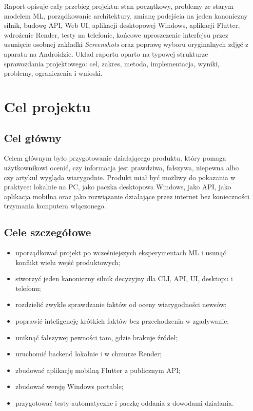 \documentclass[12pt,a4paper]{article}
\begin{document}
Raport opisuje cały przebieg projektu: stan początkowy, problemy ze starym modelem ML, porządkowanie architektury, zmianę podejścia na jeden kanoniczny silnik, budowę API, Web UI, aplikacji desktopowej Windows, aplikacji Flutter, wdrożenie Render, testy na telefonie, końcowe uproszczenie interfejsu przez usunięcie osobnej zakładki \textit{Screenshots} oraz poprawę wyboru oryginalnych zdjęć z aparatu na Androidzie.
Układ raportu oparto na typowej strukturze sprawozdania projektowego: cel, zakres, metoda, implementacja, wyniki, problemy, ograniczenia i wnioski.

\section{Cel projektu}
\subsection{Cel główny}
Celem głównym było przygotowanie działającego produktu, który pomaga użytkownikowi ocenić, czy informacja jest prawdziwa, fałszywa, niepewna albo czy artykuł wygląda wiarygodnie.
Produkt miał być możliwy do pokazania w praktyce: lokalnie na PC, jako paczka desktopowa Windows, jako API, jako aplikacja mobilna oraz jako rozwiązanie działające przez internet bez konieczności trzymania komputera włączonego.

\subsection{Cele szczegółowe}
\begin{itemize}
  \item uporządkować projekt po wcześniejszych eksperymentach ML i usunąć konflikt wielu wejść produktowych;
  \item stworzyć jeden kanoniczny silnik decyzyjny dla CLI, API, UI, desktopu i telefonu;
  \item rozdzielić zwykłe sprawdzanie faktów od oceny wiarygodności newsów;
  \item poprawić inteligencję krótkich faktów bez przechodzenia w zgadywanie;
  \item uniknąć fałszywej pewności tam, gdzie brakuje źródeł;
  \item uruchomić backend lokalnie i w chmurze Render;
  \item zbudować aplikację mobilną Flutter z publicznym API;
  \item zbudować wersję Windows portable;
  \item przygotować testy automatyczne i paczkę oddania z dowodami działania.
\end{itemize}
\end{document}
